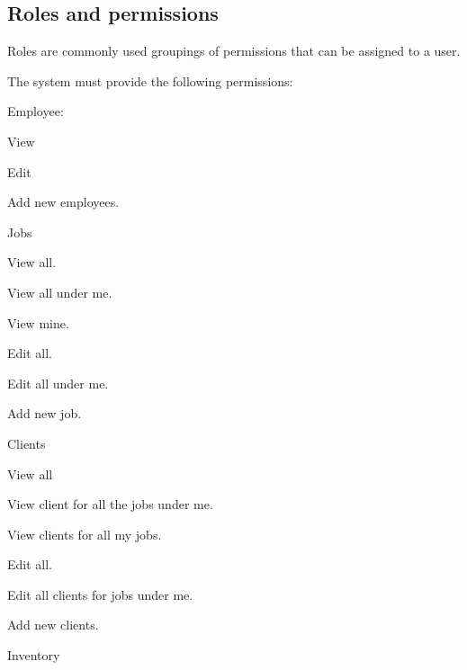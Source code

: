 \documentclass{article}
\begin{document}
	\subsection*{Roles and permissions}	
	\begin{list}{R.}{}
		\item Roles are commonly used groupings of permissions that can be assigned to a user.
		\item The system must provide the following permissions:
		\begin{list}{R.}{}
			\item Employee:
			\begin{list}{R...}{}
				\item View
				\item Edit
				\item Add new employees.
			\end{list} 
			\item Jobs
			\begin{list}{R...}{}
				\item View all.
				\item View all under me. 
				\item View mine.
				\item Edit all.
				\item Edit all under me.
				\item Add new job.
			\end{list}
			\item Clients
			\begin{list}{R...}{}
				\item View all
				\item View client for all the jobs under me.
				\item View clients for all my jobs.
				\item Edit all.
				\item Edit all clients for jobs under me.
				\item Add new clients.
			\end{list}
			\item Inventory
			\begin{list}{R...}{}

\end{list}
\end{list}
\end{list}
\end{document}
